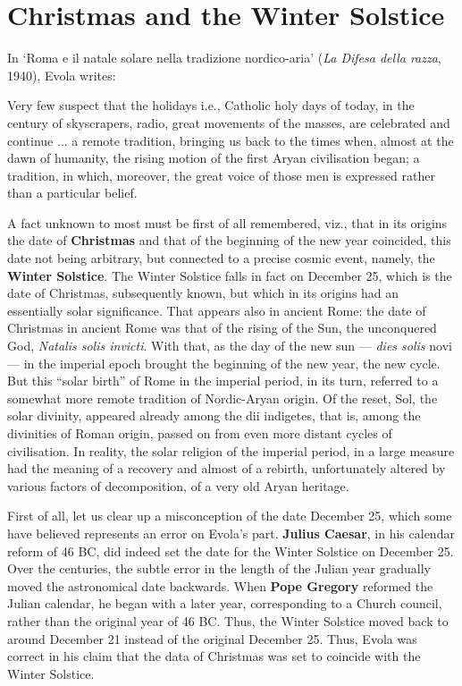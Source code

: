 \section{Christmas and the Winter Solstice}

In `Roma e il natale solare nella tradizione nordico-aria' (\emph{La Difesa della razza}, 1940), Evola writes:

\begin{quotationx}
Very few suspect that the holidays i.e., Catholic holy days of today, in the century of skyscrapers, radio, great movements of the masses, are celebrated and continue ... a remote tradition, bringing us back to the times when, almost at the dawn of humanity, the rising motion of the first Aryan civilisation began; a tradition, in which, moreover, the great voice of those men is expressed rather than a particular belief.

A fact unknown to most must be first of all remembered, viz., that in its origins the date of \textbf{Christmas} and that of the beginning of the new year coincided, this date not being arbitrary, but connected to a precise cosmic event, namely, the \textbf{Winter Solstice}. The Winter Solstice falls in fact on December 25, which is the date of Christmas, subsequently known, but which in its origins had an essentially solar significance. That appears also in ancient Rome: the date of Christmas in ancient Rome was that of the rising of the Sun, the unconquered God, \emph{Natalis solis invicti}. With that, as the day of the new sun --- \emph{dies solis} novi --- in the imperial epoch brought the beginning of the new year, the new cycle. But this ``solar birth'' of Rome in the imperial period, in its turn, referred to a somewhat more remote tradition of Nordic-Aryan origin. Of the reset, Sol, the solar divinity, appeared already among the dii indigetes, that is, among the divinities of Roman origin, passed on from even more distant cycles of civilisation. In reality, the solar religion of the imperial period, in a large measure had the meaning of a recovery and almost of a rebirth, unfortunately altered by various factors of decomposition, of a very old Aryan heritage.
\end{quotationx}

First of all, let us clear up a misconception of the date December 25, which some have believed represents an error on Evola's part. \textbf{Julius Caesar}, in his calendar reform of 46 BC, did indeed set the date for the Winter Solstice on December 25. Over the centuries, the subtle error in the length of the Julian year gradually moved the astronomical date backwards. When \textbf{Pope Gregory} reformed the Julian calendar, he began with a later year, corresponding to a Church council, rather than the original year of 46 BC. Thus, the Winter Solstice moved back to around December 21 instead of the original December 25. Thus, Evola was correct in his claim that the data of Christmas was set to coincide with the Winter Solstice.

